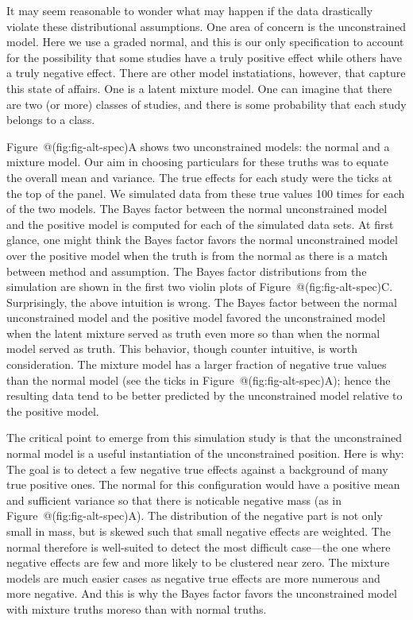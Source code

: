 \documentclass[english,man]{apa6}
\theoremstyle{definition}
\theoremstyle{definition}
\theoremstyle{definition}
\theoremstyle{remark}
\begin{document}
It may seem reasonable to wonder what may happen if the data drastically
violate these distributional assumptions. One area of concern is the
unconstrained model. Here we use a graded normal, and this is our only
specification to account for the possibility that some studies have a
truly positive effect while others have a truly negative effect. There
are other model instatiations, however, that capture this state of
affairs. One is a latent mixture model. One can imagine that there are
two (or more) classes of studies, and there is some probability that
each study belongs to a class.

Figure~@(fig:fig-alt-spec)A shows two unconstrained models: the normal
and a mixture model. Our aim in choosing particulars for these truths
was to equate the overall mean and variance. The true effects for each
study were the ticks at the top of the panel. We simulated data from
these true values 100 times for each of the two models. The Bayes factor
between the normal unconstrained model and the positive model is
computed for each of the simulated data sets. At first glance, one might
think the Bayes factor favors the normal unconstrained model over the
positive model when the truth is from the normal as there is a match
between method and assumption. The Bayes factor distributions from the
simulation are shown in the first two violin plots of
Figure~@(fig:fig-alt-spec)C. Surprisingly, the above intuition is wrong.
The Bayes factor between the normal unconstrained model and the positive
model favored the unconstrained model when the latent mixture served as
truth even more so than when the normal model served as truth. This
behavior, though counter intuitive, is worth consideration. The mixture
model has a larger fraction of negative true values than the normal
model (see the ticks in Figure~@(fig:fig-alt-spec)A); hence the
resulting data tend to be better predicted by the unconstrained model
relative to the positive model.

The critical point to emerge from this simulation study is that the
unconstrained normal model is a useful instantiation of the
unconstrained position. Here is why: The goal is to detect a few
negative true effects against a background of many true positive ones.
The normal for this configuration would have a positive mean and
sufficient variance so that there is noticable negative mass (as in
Figure~@(fig:fig-alt-spec)A). The distribution of the negative part is
not only small in mass, but is skewed such that small negative effects
are weighted. The normal therefore is well-suited to detect the most
difficult case---the one where negative effects are few and more likely
to be clustered near zero. The mixture models are much easier cases as
negative true effects are more numerous and more negative. And this is
why the Bayes factor favors the unconstrained model with mixture truths
moreso than with normal truths.
\end{document}
